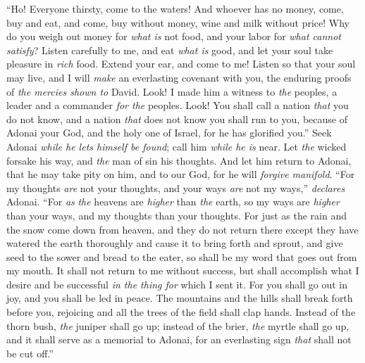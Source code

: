 \begin{biblechapter} %
 “Ho! Everyone thirsty, come to the waters! 
And whoever has no money, come, buy and eat, 
and come, buy without money, 
wine and milk without price!
\verse Why do you weigh out money for \textit{what is} not food, 
and your labor for \textit{what cannot satisfy}? 
Listen carefully to me, and eat \textit{what is} good, 
and let your soul take pleasure in \textit{rich} food.
\verse Extend your ear, and come to me! 
Listen so that your soul may live, 
and I will \textit{make} an everlasting covenant with you, 
the enduring proofs of \textit{the mercies shown to} David.
\verse Look! I made him a witness to \textit{the} peoples, 
a leader and a commander \textit{for the} peoples.
\verse Look! You shall call a nation \textit{that} you do not know, 
and a nation \textit{that} does not know you shall run to you, 
because of Adonai your God, 
and the holy one of Israel, for he has glorified you.”
\verse Seek Adonai \textit{while he lets himself be found}; 
call him \textit{while he is} near.
\verse Let \textit{the} wicked forsake his way, 
and \textit{the} man of sin his thoughts. 
And let him return to Adonai, that he may take pity on him, 
and to our God, for he will \textit{forgive manifold}.
\verse “For my thoughts \textit{are} not your thoughts, 
and your ways \textit{are} not my ways,” \textit{declares} Adonai.
\verse “For \textit{as} \textit{the} heavens are \textit{higher} than \textit{the} earth, 
so my ways are \textit{higher} than your ways, 
and my thoughts than your thoughts.
\verse For just as the rain and the snow come down from heaven, 
and they do not return there 
except they have watered the earth thoroughly 
and cause it to bring forth and sprout, 
and give seed to the sower 
and bread to the eater,
\verse so shall be my word that goes out from my mouth. 
It shall not return to me without success, 
but shall accomplish what I desire 
and be successful \textit{in the thing for} which I sent it.
\verse For you shall go out in joy, 
and you shall be led in peace. 
The mountains and the hills shall break forth before you, rejoicing 
and all the trees of the field shall clap hands.
\verse Instead of the thorn bush, \textit{the} juniper shall go up; 
instead of the brier, \textit{the} myrtle shall go up, 
and it shall serve as a memorial to Adonai, 
for an everlasting sign \textit{that} shall not be cut off.”
\end{biblechapter}

